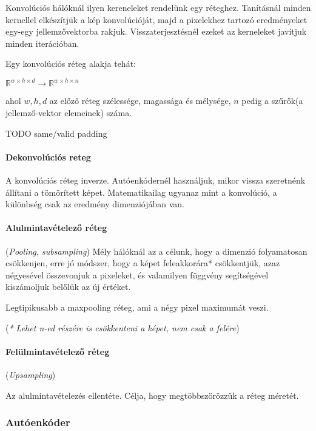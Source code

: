 Konvolúciós hálóknál ilyen kereneleket rendelünk egy réteghez.
Tanításnál minden kernellel elkészítjük a kép konvolúcióját,
majd a pixelekhez tartozó eredményeket egy-egy jellemzővektorba rakjuk.
Visszaterjesztésnél ezeket az kerneleket javítjuk minden iterációban.

\noindent
Egy konvolúciós réteg alakja tehát:

$ \mathbb{R}^{w \times h \times d} \rightarrow \mathbb{R}^{w \times h \times n} $

\noindent
ahol $ w, h,d $ az előző réteg szélessége, magassága és mélysége, 
$ n $ pedig a szűrők(a jellemző-vektor elemeinek) száma.




TODO same/valid padding



\paragraph{Dekonvolúciós reteg}
A konvolúciós réteg inverze.
Autóenkódernél használjuk, mikor vissza szeretnénk állítani
a tömörített képet. Matematikailag ugyanaz mint a konvolúció,
a különbség csak az eredmény dimenziójában van.


\paragraph{Alulmintavételező réteg} (\textit{Pooling, subsampling})
Mély hálóknál az a célunk, hogy a dimenzió folyamatosan csökkenjen, erre 
jó módszer, hogy a képet feleakkorára* csökkentjük, azaz négyesével összevonjuk
a pixeleket, és valamilyen függvény segítségével kiszámoljuk belőlük az új értéket.


Legtipikusabb a maxpooling réteg, ami a négy pixel maximumát veszi.

(\textit{* Lehet n-ed részére is csökkenteni a képet, nem csak a felére})

\paragraph{Felülmintavételező réteg} (\textit{Upsampling})

Az alulmintavételezés ellentéte. Célja, hogy megtöbbszörözzük a réteg
méretét.




\subsubsection{Autóenkóder}


